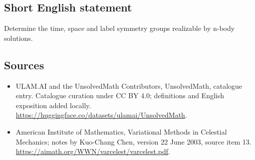 \documentclass[11pt]{article}
\begin{document}
\subsection{Short English statement}
Determine the time, space and label symmetry groups realizable by n-body solutions.
\subsection{Sources}
\begin{itemize}
\item[\hypertarget{source:statement:1}{S1}] ULAM.AI and the UnsolvedMath Contributors, UnsolvedMath, catalogue entry. Catalogue curation under CC BY 4.0; definitions and English exposition added locally.
\url{https://huggingface.co/datasets/ulamai/UnsolvedMath}.
\item[\hypertarget{source:statement:2}{S2}] American Institute of Mathematics, Variational Methods in Celestial Mechanics; notes by Kuo-Chang Chen, version 22 June 2003, source item 13.
\url{https://aimath.org/WWN/varcelest/varcelest.pdf}.
\end{itemize}
\label{end:statement}
\end{document}
